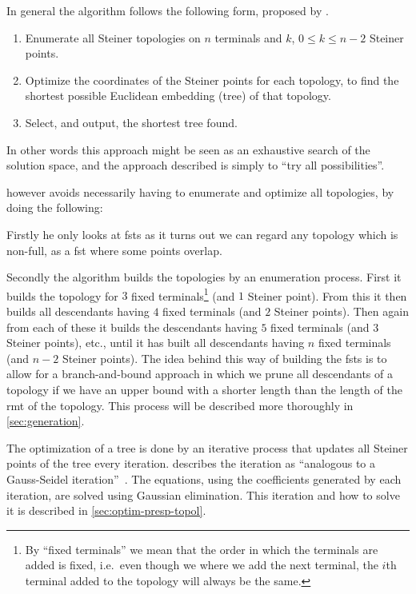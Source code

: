In general the algorithm follows the following form, proposed by \textcite{gilbert1968}.

\begin{enumerate}
\item Enumerate all Steiner topologies on $n$ terminals and $k$, $0 \le k \le
  n-2$ Steiner points.
\item Optimize the coordinates of the Steiner points for each topology, to find
  the shortest possible Euclidean embedding (tree) of that topology.
\item Select, and output, the shortest tree found.
\end{enumerate}

In other words this approach might be seen as an exhaustive search of the
solution space, and the approach described is simply to ``try all
possibilities''.

\citeauthor{smith1992} however avoids necessarily having to enumerate and optimize all
topologies, by doing the following:

Firstly he only looks at \acp{fst} as it
turns out we can regard any topology which is non-full, as a \ac{fst} where
some points overlap.

Secondly the algorithm builds the topologies by an enumeration process. First it
builds the topology for $3$ fixed terminals\footnote{By ``fixed terminals'' we
  mean that the order in which the terminals are added is fixed, i.e.\ even
  though we where we add the next terminal, the $i$th terminal added to the
  topology will always be the same.} (and $1$ Steiner point). From this it then
builds all descendants having $4$ fixed terminals (and $2$ Steiner points). Then
again from each of these it builds the descendants having $5$ fixed terminals
(and $3$ Steiner points), etc., until it has built all descendants having $n$
fixed terminals (and $n-2$ Steiner points). The idea behind this way of building
the \acp{fst} is to allow for a branch-and-bound approach in which we prune all
descendants of a topology if we have an upper bound with a shorter length than
the length of the \ac{rmt} of the topology. This process will be described more
thoroughly in \cref{sec:generation}.

The optimization of a tree is done by an iterative process that updates all
Steiner points of the tree every iteration. \citeauthor{smith1992}
describes the iteration as ``analogous to a Gauss-Seidel
iteration''~\cite[p.~145]{smith1992}. The equations, using the coefficients
generated by each iteration, are solved using Gaussian elimination. This
iteration and how to solve it is described in \cref{sec:optim-presp-topol}.

